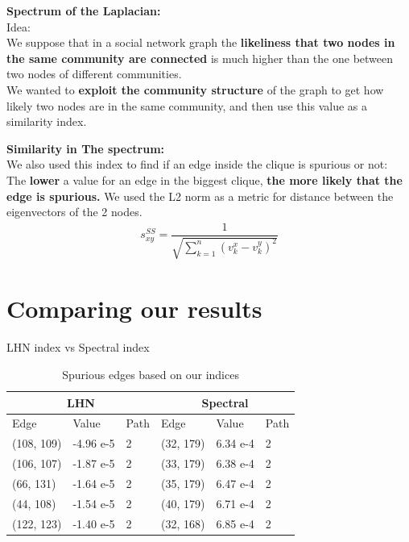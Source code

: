 \documentclass{beamer}
\begin{document}
\begin{frame}
\textbf{Spectrum of the Laplacian:} \\
\vspace{0.6cm}
\color{teal}Idea:\color{black} \\
We suppose that in a social network graph the \textbf{likeliness that two nodes in the same community are connected} is much higher than the one between two nodes of different communities. \\
\vspace{0.2cm}
We wanted to \textbf{exploit the community structure} of the graph to get how likely two nodes are in the same community, and then use this value as a similarity index. \\ 
\end{frame}

\begin{frame}
\textbf{Similarity in The spectrum:} \\
We also used this index to find if an edge inside the clique is spurious or not:\\
The \textbf{lower} a value for an edge in the biggest clique, \textbf{the more likely that the edge is spurious.}
We used the L2 norm as a metric for distance between the eigenvectors of the 2 nodes.\\
\vspace{0.2cm}
\begin{align*}
s^{SS}_{xy} = \dfrac{1}{\sqrt{\sum_{k=1}^{n} (v^{x}_{k}-v^{y}_{k})^{2} }}
\end{align*}
\end{frame}

\section{Comparing our results}
\begin{frame}{LHN index vs Spectral index}
    \begin{table}[]
        \centering
        \begin{tabular}{llllll}
            \hline
            \multicolumn{3}{c|}{LHN} & \multicolumn{3}{|c}{Spectral}\\
            \hline
            Edge & Value & Path & Edge & Value & Path\\
            \hline
            \hline
            (108, 109) & -4.96 e-5 & 2 & (32, 179) & 6.34 e-4 & 2\\
            (106, 107) & -1.87 e-5 & 2 & (33, 179) & 6.38 e-4 & 2\\
            (66,  131) & -1.64 e-5 & 2 & (35, 179) & 6.47 e-4 & 2\\
            (44,  108) & -1.54 e-5& 2 & (40, 179) & 6.71 e-4 & 2\\
            (122, 123) & -1.40 e-5 & 2 & (32, 168) & 6.85 e-4 & 2\\
        \end{tabular}
        \caption{Spurious edges based on our indices}
        \label{tab:clique1_edges}
    \end{table}
\end{frame}
\end{document}
